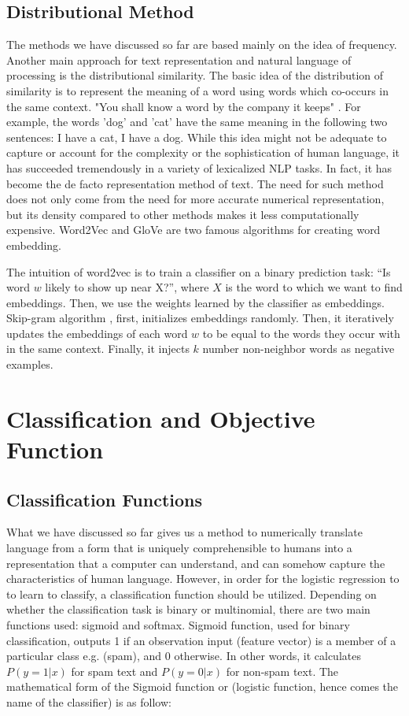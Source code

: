 \subsection{Distributional Method}
The methods we have discussed so far are based mainly on the idea of frequency. Another main approach for text representation and natural language of processing is the distributional similarity. The basic idea of the distribution of similarity is to represent the meaning of a word using words which co-occurs in the same context. "You shall know a word by the company it keeps" \citep{firth1957synopsis}. For example, the words 'dog' and 'cat' have the same meaning in the following two sentences: I have a cat, I have a dog. While this idea might not be adequate to capture or account for the complexity or the sophistication of human language, it has succeeded tremendously in a variety of lexicalized NLP tasks. In fact, it has become the de facto representation method of text. The need for such method does not only come from the need for more accurate numerical representation, but its density compared to other methods makes it less computationally expensive. Word2Vec \citep{mikolov2013distributed} and GloVe \citep{pennington2014glove} are two famous algorithms for creating word embedding. 

The intuition of word2vec is to train a classifier on a binary prediction task: “Is
word $w$ likely to show up near X?”, where $X$ is the word to which we want to find embeddings. Then, we use the weights learned by the classifier as embeddings. Skip-gram algorithm \citep{mikolov2013distributed} , first, initializes embeddings randomly. Then, it iteratively updates the embeddings of each word $w$ to be equal to the words they occur with in the same context. Finally, it injects $k$ number non-neighbor words as negative examples. 

\section{Classification and Objective Function}
\subsection{Classification Functions}
What we have discussed so far gives us a method to numerically translate language from a form that is uniquely comprehensible to humans into a representation that a computer can understand, and can somehow capture the characteristics of human language. However, in order for the logistic regression to to learn to classify, a classification function should be utilized. Depending on whether the classification task is binary or multinomial, there are two main functions used: sigmoid and softmax. Sigmoid function, used for binary classification, outputs 1 if an observation input (feature vector) is a member of a particular class e.g. (spam), and 0 otherwise. In other words, it calculates $P(y=1|x)$ for spam text and $P(y=0|x)$ for non-spam text. The mathematical form of the Sigmoid function or (logistic function, hence comes the name of the classifier) is as follow:

